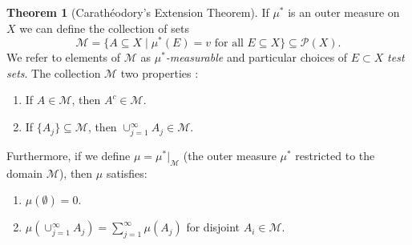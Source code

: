 \documentclass{article}
\theoremstyle{definition}
\newtheorem{theorem}{Theorem}[section]
\begin{document}
 \begin{theorem}[Carathéodory's Extension Theorem]
 If $\mu^*$ is an outer measure on $X$ we can define the collection of sets 
 $$ \mathcal M = \{A\subseteq X \mid \mu^*(E) =v \text{ for all }E\subseteq X\}\subseteq \mathcal P(X).$$ We refer to elements of $\mathcal M$ as \textit{\color{red}$ \mu^* $-measurable} and particular choices of $E\subset X$ \textit{\color{red}test sets}.
 The collection $\mathcal M$ two properties :
 \begin{enumerate}
 	\item If $A\in \mathcal M$, then $A^c\in\mathcal M$.
 	\item If $\{A_j\}\subseteq \mathcal M$, then $\cup_{j=1}^\infty A_j\in \mathcal M$.
 \end{enumerate}
Furthermore, if we define $\mu = \mu^*|_{\mathcal M}$ (the outer measure $\mu^*$ restricted to the domain $\mathcal M$), then $\mu$ satisfies:
\begin{enumerate}
	\item $\mu(\emptyset) = 0$.
\item $\mu(\cup_{j=1}^\infty A_j) = \sum_{j=1}^{\infty}\mu(A_j)$ for disjoint $A_i\in \mathcal M$.
\end{enumerate}
 \end{theorem}
\end{document}

